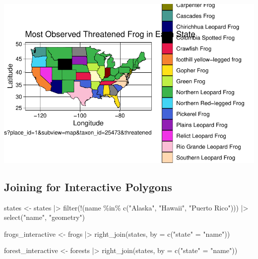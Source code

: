 \documentclass[
  letterpaper,
  DIV=11,
  numbers=noendperiod]{scrartcl}
\newenvironment{Shaded}{\begin{snugshade}}{\end{snugshade}}
\newcommand{\AttributeTok}[1]{\textcolor[rgb]{0.40,0.45,0.13}{#1}}
\newcommand{\FunctionTok}[1]{\textcolor[rgb]{0.28,0.35,0.67}{#1}}
\newcommand{\NormalTok}[1]{\textcolor[rgb]{0.00,0.23,0.31}{#1}}
\newcommand{\OtherTok}[1]{\textcolor[rgb]{0.00,0.23,0.31}{#1}}
\newcommand{\SpecialCharTok}[1]{\textcolor[rgb]{0.37,0.37,0.37}{#1}}
\newcommand{\StringTok}[1]{\textcolor[rgb]{0.13,0.47,0.30}{#1}}
\begin{document}
\includegraphics{MiniProject1_files/figure-pdf/unnamed-chunk-5-1.pdf}

\subsection{Joining for Interactive
Polygons}\label{joining-for-interactive-polygons}

\begin{Shaded}
\begin{Highlighting}[]
\NormalTok{states }\OtherTok{\textless{}{-}}\NormalTok{ states }\SpecialCharTok{|\textgreater{}}
  \FunctionTok{filter}\NormalTok{(}\SpecialCharTok{!}\NormalTok{(name }\SpecialCharTok{\%in\%} \FunctionTok{c}\NormalTok{(}\StringTok{"Alaska"}\NormalTok{, }\StringTok{"Hawaii"}\NormalTok{, }\StringTok{"Puerto Rico"}\NormalTok{))) }\SpecialCharTok{|\textgreater{}}
  \FunctionTok{select}\NormalTok{(}\StringTok{"name"}\NormalTok{, }\StringTok{"geometry"}\NormalTok{)}

\NormalTok{frogs\_interactive }\OtherTok{\textless{}{-}}\NormalTok{ frogs }\SpecialCharTok{|\textgreater{}}
  \FunctionTok{right\_join}\NormalTok{(states, }\AttributeTok{by =} \FunctionTok{c}\NormalTok{(}\StringTok{"state"} \OtherTok{=} \StringTok{"name"}\NormalTok{))}
\end{Highlighting}
\end{Shaded}

\begin{Shaded}
\begin{Highlighting}[]
\NormalTok{forest\_interactive }\OtherTok{\textless{}{-}}\NormalTok{ forests }\SpecialCharTok{|\textgreater{}}
  \FunctionTok{right\_join}\NormalTok{(states, }\AttributeTok{by =} \FunctionTok{c}\NormalTok{(}\StringTok{"state"} \OtherTok{=} \StringTok{"name"}\NormalTok{))}
\end{Highlighting}
\end{Shaded}
\end{document}
